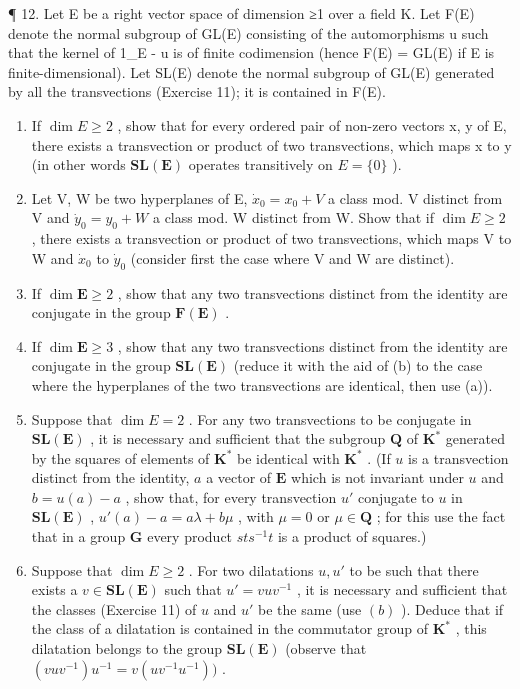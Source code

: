 ¶ 12. Let E be a right vector space of dimension ≥1 over a field K. Let F(E) denote the normal subgroup of GL(E) consisting of the automorphisms u such that the kernel of 1\_E - u is of finite codimension (hence F(E) = GL(E) if E is finite-dimensional). Let SL(E) denote the normal subgroup of GL(E) generated by all the transvections (Exercise 11); it is contained in F(E).

\begin{enumerate}
\def\labelenumi{(\alph{enumi})}
\item
  If \(\dim E \geqslant 2\) , show that for every ordered pair of non-zero vectors x, y of E, there exists a transvection or product of two transvections, which maps x to y (in other words \(\mathbf{SL}(\mathbf{E})\) operates transitively on \(E = \{0\}\) ).
\item
  Let V, W be two hyperplanes of E, \(\dot{x}_{0} = x_{0} + V\) a class mod. V distinct from V and \(\dot{y}_{0} = y_{0} + W\) a class mod. W distinct from W. Show that if \(\dim E \geqslant 2\) , there exists a transvection or product of two transvections, which maps V to W and \(\dot{x}_{0}\) to \(\dot{y}_{0}\) (consider first the case where V and W are distinct).
\item
  If \(\dim \mathbf{E} \geqslant 2\) , show that any two transvections distinct from the identity are conjugate in the group \(\mathbf{F}(\mathbf{E})\) .
\item
  If \(\dim \mathbf{E} \geqslant 3\) , show that any two transvections distinct from the identity are conjugate in the group \(\mathbf{SL}(\mathbf{E})\) (reduce it with the aid of (b) to the case where the hyperplanes of the two transvections are identical, then use (a)).
\item
  Suppose that \(\dim E = 2\) . For any two transvections to be conjugate in \(\mathbf{SL}(\mathbf{E})\) , it is necessary and sufficient that the subgroup \(\mathbf{Q}\) of \(\mathbf{K}^*\) generated by the squares of elements of \(\mathbf{K}^*\) be identical with \(\mathbf{K}^*\) . (If \(u\) is a transvection distinct from the identity, \(a\) a vector of \(\mathbf{E}\) which is not invariant under \(u\) and \(b = u(a) - a\) , show that, for every transvection \(u'\) conjugate to \(u\) in \(\mathbf{SL}(\mathbf{E})\) , \(u'(a) - a = a\lambda + b\mu\) , with \(\mu = 0\) or \(\mu \in \mathbf{Q}\) ; for this use the fact that in a group \(\mathbf{G}\) every product \(sts^{-1}t\) is a product of squares.)
\item
  Suppose that \(\dim E \geqslant 2\) . For two dilatations \(u, u'\) to be such that there exists a \(v \in \mathbf{SL}(\mathbf{E})\) such that \(u' = vuv^{-1}\) , it is necessary and sufficient that the classes (Exercise 11) of \(u\) and \(u'\) be the same (use \((b)\) ). Deduce that if the class of a dilatation is contained in the commutator group of \(\mathbf{K}^*\) , this dilatation belongs to the group \(\mathbf{SL}(\mathbf{E})\) (observe that \((vuv^{-1})u^{-1} = v(uv^{-1}u^{-1}))\) .
\end{enumerate}

